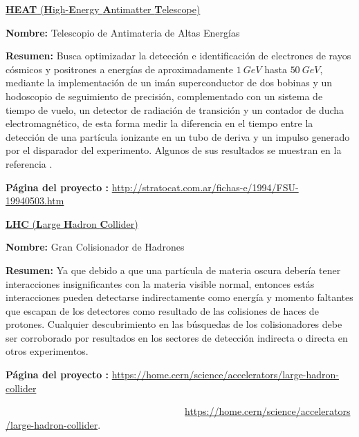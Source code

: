 \href{https://ui.adsabs.harvard.edu/abs/1995psu..reptR....B/abstract}{\textbf{HEAT} (\textbf{H}igh-\textbf{E}nergy \textbf{A}ntimatter \textbf{T}elescope)}
\begin{itemize_f}
\item \textbf{Nombre:} Telescopio de Antimateria de Altas Energías
\item \textbf{Resumen:} Busca optimizadar la detección e identificación de electrones de rayos cósmicos y positrones a energías de aproximadamente $1~ GeV$ hasta $50~GeV$, mediante la implementación de un imán superconductor de dos bobinas y un hodoscopio de seguimiento de precisión, complementado con un sistema de tiempo de vuelo, un detector de radiación de transición y un contador de ducha electromagnético, de esta forma medir la diferencia en el tiempo entre la detección de una partícula ionizante en un tubo de deriva y un impulso generado por el disparador del experimento. Algunos de sus resultados se muestran en la referencia \cite{hooper_kaluza-klein_2004}.
\item \textbf{Página del proyecto :} \href{http://stratocat.com.ar/fichas-e/1994/FSU-19940503.htm}{http://stratocat.com.ar/fichas-e/1994/\-FSU-\-19940503.htm}
\end{itemize_f}

\href{https://en.wikipedia.org/wiki/Large_Hadron_Collider}{\textbf{LHC} (\textbf{L}arge \textbf{H}adron \textbf{C}ollider)}
\begin{itemize_f}\label{lhc}
\item \textbf{Nombre:} Gran Colisionador de Hadrones
\item \textbf{Resumen:} Ya que debido a que una partícula de materia oscura debería tener interacciones insignificantes con la materia visible normal, entonces estás interacciones pueden detectarse indirectamente como energía y momento faltantes que escapan de los detectores como resultado de las colisiones de haces de protones. Cualquier descubrimiento en las búsquedas de los colisionadores debe ser corroborado por resultados en los sectores de detección indirecta o directa en otros experimentos.
\item \textbf{Página del proyecto :} \href{https://home.cern/science/accelerators/large-hadron-collider}{https://home.cern/science/accelerators/\-large-\-hadron-\-collider}

~~~~~~~~~~~~~~~~~~~~~~~~~~~~~~~~~~~~~\href{https://home.cern/science/accelerators/large-hadron-collider}{https://home.cern/science/accelerators/\-lar\-ge-\-ha\-dron-\-co\-lli\-der}. 
\end{itemize_f}

